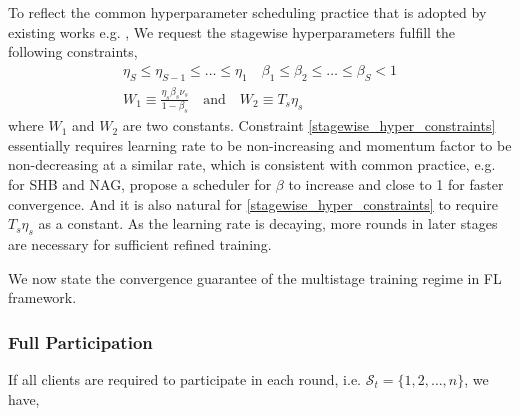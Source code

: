 To reflect the common hyperparameter scheduling practice that is adopted by existing works e.g. \cite{Sutskever13Init,Smith18DontDecay,liu2020improved}, We request the stagewise hyperparameters fulfill the following constraints,
\begin{equation}
    \begin{gathered}
    \eta_{S}\leq\eta_{S-1}\leq\dots\leq\eta_{1} \quad \beta_1\leq\beta_2\leq\dots\leq\beta_{S}<1\\
    W_1 \equiv \frac{\eta_s\beta_s\nu_s}{1-\beta_s} \quad \text{and} \quad  W_2\equiv T_s\eta_s
    \end{gathered}
\label{stagewise_hyper_constraints}
\end{equation}
where $W_1$ and $W_2$ are two constants. Constraint \eqref{stagewise_hyper_constraints} essentially requires learning rate to be non-increasing and momentum factor to be non-decreasing at a similar rate, which is consistent with common practice, e.g. for SHB and NAG, \cite{Sutskever13Init,Smith18DontDecay,liu2020improved} propose a scheduler for $\beta$ to increase and close to 1 for faster convergence. And it is also natural for \eqref{stagewise_hyper_constraints} to require $T_s\eta_s$ as a constant. As the learning rate is decaying, more rounds in later stages are necessary for sufficient refined training. 

We now state the convergence guarantee of the multistage training regime in FL framework.

\subsubsection{Full Participation}
\label{subsec:full_participation}

If all clients are required to participate in each round, i.e. $\mathcal{S}_t=\{1,2,\dots,n\}$, we have,


